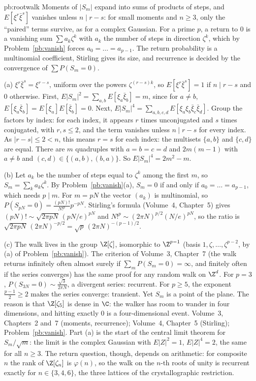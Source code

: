 \begin{solution}{pb:rootwalk}
\idea Moments of $|S_m|$ expand into sums of products of steps, and $E[\xi^r\bar\xi^s]$ vanishes unless $n\mid r-s$: for small
moments and $n\ge3$, only the ``paired'' terms survive, as for a complex Gaussian. For a prime $p$, a return to $0$ is a
vanishing sum $\sum a_k\zeta^k$ with $a_k$ the number of steps in direction $\zeta^k$, which by Problem~\ref{pb:vanish} forces
$a_0=\dots=a_{p-1}$. The return probability is a multinomial coefficient, Stirling gives its size, and recurrence is decided
by the convergence of $\sum P(S_m=0)$.

\writeup (a) $\xi^r\bar\xi^s=\xi^{r-s}$, uniform over the powers $\zeta^{(r-s)k}$, so $E[\xi^r\bar\xi^s]=1$ if $n\mid r-s$ and $0$
otherwise. First, $E|S_m|^2=\sum_{a,b}E[\xi_a\bar\xi_b]=m$, since for $a\ne b$, $E[\xi_a\bar\xi_b]=E[\xi_a]E[\bar\xi_b]=0$.
Next, $E|S_m|^4=\sum_{a,b,c,d}E[\xi_a\xi_b\bar\xi_c\bar\xi_d]$. Group the factors by index: for each index, it appears $r$ times
unconjugated and $s$ times conjugated, with $r,s\le2$, and the term vanishes unless $n\mid r-s$ for every index. As
$|r-s|\le2<n$, this means $r=s$ for each index: the multisets $\{a,b\}$ and $\{c,d\}$ are equal. There are $m$ quadruples
with $a=b=c=d$ and $2m(m-1)$ with $a\ne b$ and $(c,d)\in\{(a,b),(b,a)\}$. So $E|S_m|^4=2m^2-m$.

(b) Let $a_k$ be the number of steps equal to $\zeta^k$ among the first $m$, so $S_m=\sum_ka_k\zeta^k$. By
Problem~\ref{pb:vanish}(a), $S_m=0$ if and only if $a_0=\dots=a_{p-1}$, which needs $p\mid m$. For $m=pN$ the vector
$(a_k)$ is multinomial, so $P(S_{pN}=0)=\frac{(pN)!}{N!^p}p^{-pN}$. Stirling's formula (Volume~4, Chapter~5) gives
$(pN)!\sim\sqrt{2\pi pN}\,(pN/e)^{pN}$ and $N!^p\sim(2\pi N)^{p/2}(N/e)^{pN}$, so the ratio is
$\sqrt{2\pi pN}\,(2\pi N)^{-p/2}=\sqrt p\,(2\pi N)^{-(p-1)/2}$.

(c) The walk lives in the group $\Z[\zeta]$, isomorphic to $\Z^{p-1}$ (basis $1,\zeta,\dots,\zeta^{p-2}$, by (a) of
Problem~\ref{pb:vanish}). The criterion of Volume~3, Chapter~7 (the walk returns infinitely often almost surely if
$\sum_mP(S_m=0)=\infty$, and finitely often if the series converges) has the same proof for any random walk on $\Z^d$. For
$p=3$, $P(S_{3N}=0)\sim\frac{\sqrt3}{2\pi N}$, a divergent series: recurrent. For $p\ge5$, the exponent $\frac{p-1}2\ge2$
makes the series converge: transient. Yet $S_m$ is a point of the plane. The reason is that $\Z[\zeta_5]$ is dense in $\C$:
the walker has room to wander in four dimensions, and hitting exactly $0$ is a four-dimensional event.
\tools Volume~3, Chapters~2 and~7 (moments, recurrence); Volume~4, Chapter~5 (Stirling); Problem~\ref{pb:vanish}.
\leads Part (a) is the start of the central limit theorem for $S_m/\sqrt m$: the limit is the complex Gaussian with
$E|Z|^2=1$, $E|Z|^4=2$, the same for all $n\ge3$. The return question, though, depends on arithmetic: for composite $n$ the
rank of $\Z[\zeta_n]$ is $\varphi(n)$, so the walk on the $n$-th roots of unity is recurrent exactly for $n\in\{3,4,6\}$, the
three lattices of the crystallographic restriction.
\end{solution}


